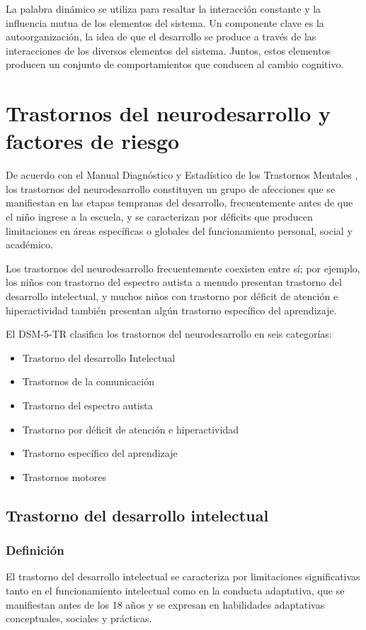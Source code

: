 \documentclass[11pt,letterpaper]{report}
\begin{document}
La palabra dinámico se utiliza para resaltar la interacción constante y la
influencia mutua de los elementos del sistema. Un componente clave es la
autoorganización, la idea de que el desarrollo se produce a través de las
interacciones de los diversos elementos del sistema. Juntos, estos elementos
producen un conjunto de comportamientos que conducen al cambio cognitivo.
\cite{Gauvain2022}

\section{Trastornos del neurodesarrollo y factores de riesgo}
De acuerdo con el Manual Diagnóstico y Estadístico de los Trastornos Mentales
\cite{DSM5TR}, los trastornos del neurodesarrollo constituyen un grupo de 
afecciones que se manifiestan en las etapas tempranas del desarrollo, 
frecuentemente antes de que el niño ingrese a la escuela, y se caracterizan 
por déficits que producen limitaciones en áreas específicas o globales del
funcionamiento personal, social y académico.

Los trastornos del neurodesarrollo frecuentemente coexisten entre sí; por 
ejemplo, los niños con trastorno del espectro autista a menudo presentan 
trastorno del desarrollo intelectual, y muchos niños con trastorno por déficit
de atención e hiperactividad también presentan algún trastorno específico del
aprendizaje. \cite{DSM5TR}

El DSM-5-TR clasifica los trastornos del neurodesarrollo en seis categorías:
    \begin{itemize}
        \item Trastorno del desarrollo Intelectual
        \item Trastornos de la comunicación
        \item Trastorno del espectro autista
        \item Trastorno por déficit de atención e hiperactividad
        \item Trastorno específico del aprendizaje
        \item Trastornos motores
    \end{itemize}

\subsection{Trastorno del desarrollo intelectual}
\subsubsection{Definición}
El trastorno del desarrollo intelectual se caracteriza por limitaciones 
significativas tanto en el funcionamiento intelectual como en la conducta 
adaptativa, que se manifiestan antes de los 18 años y se expresan en 
habilidades adaptativas conceptuales, sociales y prácticas. \cite{Simms2023}
\end{document}
